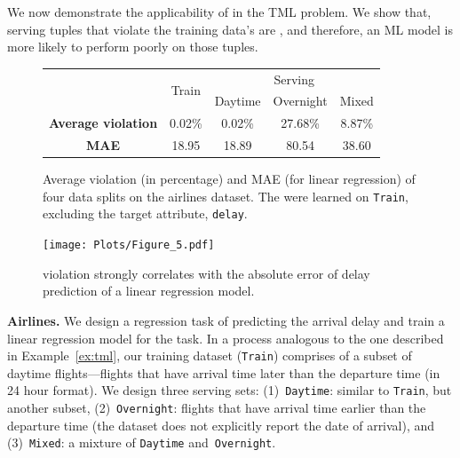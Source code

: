  We now demonstrate the applicability of \dis in the TML problem.
We show that, serving tuples that violate the training data's \dis are \nc, and
therefore, an ML model is more likely to perform poorly on those tuples.


\smallskip

\begin{figure}[t!]
	\centering
	\setlength{\tabcolsep}{5pt}
	\renewcommand\arraystretch{0.88}
	\small{
	\begin{tabular}{ccccc}
		\hline
		&  \multirow{ 2}{*}{Train} & \multicolumn{3}{c}{Serving}\\
		\cline{3-5}
		&& Daytime & Overnight & Mixed \\
		\midrule
		\textbf{Average violation} & 0.02\% & 0.02\% & 27.68\% & 8.87\%\\
		\textbf{MAE} & 18.95	 &  18.89 & 80.54 & 38.60\\
		\bottomrule
		
	\end{tabular}
	}
		\vspace{-3mm}	
	 \caption{Average \invariant violation (in percentage) and MAE (for linear regression) 
	 of four data splits on the airlines dataset. The \invariants were learned on
 	 \texttt{Train}, excluding the target attribute, \texttt{delay}.}
	 
	\label{fig:airlines-summary}
	\vspace{2mm}
	\centering
	\texttt{[image: Plots/Figure\_5.pdf]}
	\vspace{-3mm}	
	\caption{\Invariant violation strongly correlates with the absolute error
	 of delay prediction of a linear regression model.}
	 \vspace{2mm}	
	\label{fig:airlines}
\end{figure}


\noindent \textbf{Airlines.} We design a regression task of predicting the
arrival delay and train a linear regression model for the task.  In
a process analogous to the one described in Example~\ref{ex:tml}, our training
dataset (\texttt{Train}) comprises of a subset of daytime flights---flights
that have arrival time later than the departure time (in 24 hour format). We
design three serving sets: (1)~\texttt{Daytime}: similar to \texttt{Train}, but
another subset, (2)~\texttt{Overnight}: flights that have arrival time earlier
than the departure time (the dataset does not explicitly report the date of
arrival), and (3)~\texttt{Mixed}: a mixture of \texttt{Daytime}
and~\texttt{Overnight}. 

